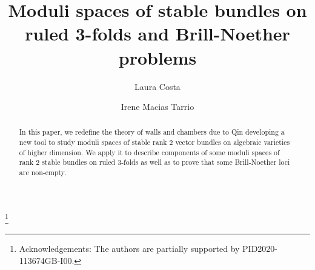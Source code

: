 \documentclass[11pt,twoside]{amsart}
\theoremstyle{definition}
\begin{document}
\author[Laura Costa]{Laura Costa}
\address{Department de matem\`{a}tiques i Inform\`{a}tica, Universitat de Barcelona, Gran Via de les Corts Catalanes 585, 08007 Barcelona,
Spain}

\author[Irene Macías Tarrío]{Irene Macias Tarrio}
\address{Department de matem\`{a}tiques i Inform\`{a}tica, Universitat de Barcelona, Gran Via de les Corts Catalanes 585, 08007 Barcelona,
Spain}



\title[Moduli spaces on ruled 3-folds]{Moduli spaces of stable bundles on ruled 3-folds and Brill-Noether problems}

\begin{abstract}
In this paper, we redefine the theory of walls and chambers due to Qin developing a new tool to study moduli spaces of stable rank 2 vector bundles on algebraic varieties of higher dimension. We apply it to describe components of some moduli spaces of rank 2 stable bundles on ruled 3-folds as well as to prove that some Brill-Noether loci are non-empty.  
\end{abstract}
\thanks{Acknowledgements:   The authors  are partially   supported
by PID2020-113674GB-I00.}


\maketitle



\tableofcontents

\markboth{}{}
\end{document}
